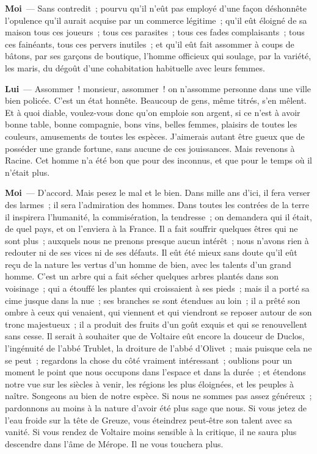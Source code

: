 \documentclass[french,twoside]{book} %
\newcommand{\labelchar}[1]{\textbf{\color{rubric} #1}}
\begin{document}
\labelchar{Moi} — Sans contredit ; pourvu qu’il n’eût pas employé d’une façon déshonnête l’opulence qu’il aurait acquise par un commerce légitime ; qu’il eût éloigné de sa maison tous ces joueurs ; tous ces parasites ; tous ces fades complaisants ; tous ces fainéants, tous ces pervers inutiles ; et qu’il eût fait assommer à coups de bâtons, par ses garçons de boutique, l’homme officieux qui soulage, par la variété, les maris, du dégoût d’une cohabitation habituelle avec leurs femmes.\par
\labelchar{Lui} — Assommer ! monsieur, assommer ! on n’assomme personne dans une ville bien policée. C’est un état honnête. Beaucoup de gens, même titrés, s’en mêlent. Et à quoi diable, voulez-vous donc qu’on emploie son argent, si ce n’est à avoir bonne table, bonne compagnie, bons vins, belles femmes, plaisirs de toutes les couleurs, amusements de toutes les espèces. J’aimerais autant être gueux que de posséder une grande fortune, sans aucune de ces jouissances. Mais revenons à Racine. Cet homme n’a été bon que pour des inconnus, et que pour le temps où il n’était plus.\par
\labelchar{Moi} — D’accord. Mais pesez le mal et le bien. Dans mille ans d’ici, il fera verser des larmes ; il sera l’admiration des hommes. Dans toutes les contrées de la terre il inspirera l’humanité, la commisération, la tendresse ; on demandera qui il était, de quel pays, et on l’enviera à la France. Il a fait souffrir quelques êtres qui ne sont plus ; auxquels nous ne prenons presque aucun intérêt ; nous n’avons rien à redouter ni de ses vices ni de ses défauts. Il eût été mieux sans doute qu’il eût reçu de la nature les vertus d’un homme de bien, avec les talents d’un grand homme. C’est un arbre qui a fait sécher quelques arbres plantés dans son voisinage ; qui a étouffé les plantes qui croissaient à ses pieds ; mais il a porté sa cime jusque dans la nue ; ses branches se sont étendues au loin ; il a prêté son ombre à ceux qui venaient, qui viennent et qui viendront se reposer autour de son tronc majestueux ; il a produit des fruits d’un goût exquis et qui se renouvellent sans cesse. Il serait à souhaiter que de Voltaire eût encore la douceur de Duclos, l’ingénuité de l’abbé Trublet, la droiture de l’abbé d’Olivet ; mais puisque cela ne se peut ; regardons la chose du côté vraiment intéressant ; oublions pour un moment le point que nous occupons dans l’espace et dans la durée ; et étendons notre vue sur les siècles à venir, les régions les plus éloignées, et les peuples à naître. Songeons au bien de notre espèce. Si nous ne sommes pas assez généreux ; pardonnons au moins à la nature d’avoir été plus sage que nous. Si vous jetez de l’eau froide sur la tête de Greuze, vous éteindrez peut-être son talent avec sa vanité. Si vous rendez de Voltaire moins sensible à la critique, il ne saura plus descendre dans l’âme de Mérope. Il ne vous touchera plus.\par
\end{document}

